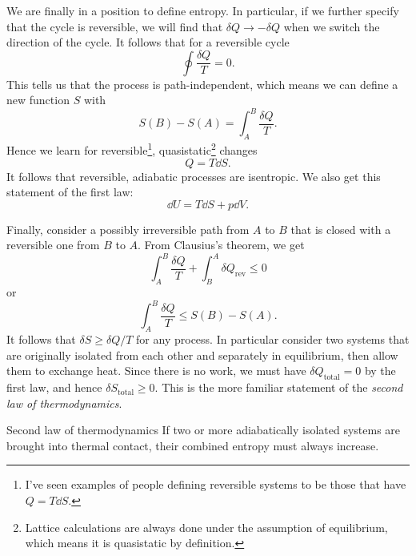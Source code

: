 We are finally in a position to define entropy.
In particular, if we further specify that the cycle is reversible,
we will find that $\delta Q\to-\delta Q$ when we switch the direction of the
cycle. It follows that for a reversible cycle
\begin{equation}
 \oint\frac{\delta Q}{T}=0. 
\end{equation}
This tells us that the process is path-independent, which means we can define a
new function $S$ with
\begin{equation}
 S(B)-S(A)=\int_A^B\frac{\delta Q}{T}. 
\end{equation}
Hence we learn for reversible\footnote{I've seen examples of people defining
reversible systems to be those that have $Q=T\dd{S}$.}, 
quasistatic\footnote{Lattice calculations are always done under the assumption
of equilibrium, which means it is quasistatic by definition.} changes
\begin{equation}
Q=T\dd{S}.
\end{equation}
It follows that reversible, adiabatic processes are isentropic.
We also get this statement of the first law:
\begin{equation}
 \dd U = T\dd{S}+p\dd{V}.
\end{equation} 

Finally, consider a possibly irreversible path from $A$ to $B$ that is closed
with a reversible one from $B$ to $A$. From Clausius's theorem, we get
\begin{equation}
\int_A^B\frac{\delta Q}{T}+\int_B^A\delta Q_{\text{rev}}\leq0
\end{equation}
or
\begin{equation}
\int_A^B\frac{\delta Q}{T}\leq S(B)-S(A).
\end{equation}
It follows that $\delta S\geq\delta Q/T$ for any process. In particular consider
two systems that are originally isolated from each other and separately in
equilibrium, then allow them to exchange heat. Since there is no work, we must
have $\delta Q_{\text{total}}=0$ by the first law, and hence $\delta
S_{\text{total}}\geq0$. This is the more familiar statement of
the {\it second law of thermodynamics}.
\begin{theorem}{Second law of thermodynamics}{}
If two or more adiabatically isolated systems are brought into thermal contact,
their combined entropy must always increase.
\end{theorem}

